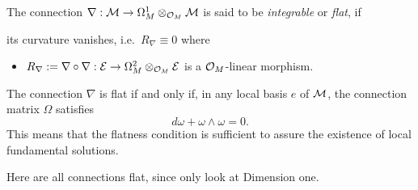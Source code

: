 \begin{defn}
  The connection $\nabla:\mathcal{M}\to \Omega_M^1\otimes_{\mathcal{O}_M}\mathcal{M}$ is said to be
  \emph{integrable} or \emph{flat}, if
  \begin{einr}
    its curvature vanishes, i.e.\ $R_\nabla\equiv0$ where
    \begin{itemize}
      \item $R_\nabla:=\nabla\circ\nabla:\mathcal{E}\to\Omega_M^2\otimes_{\mathcal{O}_M}\mathcal{E}$
        is a $\mathcal{O}_M$-linear morphism.
    \end{itemize}
  \end{einr}
  \begin{s-prop}
    The connection $\nabla$ is flat if and only if, in any local basis $e$ of
    $\mathcal{M}$, the connection matrix $\Omega$ satisfies
    \[
      d\omega + \omega \wedge \omega = 0.
    \]
    This means that the flatness condition is sufficient to assure the
    existence of local fundamental solutions.
  \end{s-prop}
  \begin{s-rem}
    Here are all connections flat, since only look at Dimension one.
  \end{s-rem}
  \begin{comment}
    We will say that a connection on a meromorphic bundle is \emph{integrable}
    or \emph{flat} if its restriction to $M\backslash Z$ is an integrable
    connection on the holomorphic bundle $\sM_{|M\backslash Z}$.
  \end{comment}
\end{defn}

